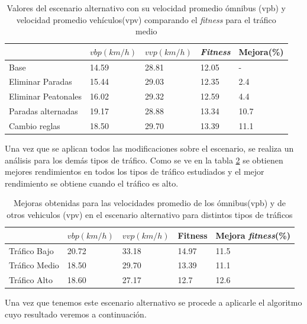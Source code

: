 \begin{table}[H]
	\renewcommand{\arraystretch}{1.2}
	\caption{Valores del escenario alternativo con su velocidad promedio ómnibus (vpb) y velocidad promedio vehículos(vpv) comparando el \emph{fitness} para el tráfico medio }
	\label{table:resultado_alternativo}
	\centering
	\begin{tabular}{p{3.5cm}p{2.5cm}p{2.5cm}p{2cm}p{2cm} }
		\hline
		&
		$vbp(km/h)$& 
		$vvp(km/h)$ & 
		\emph{Fitness} &
		Mejora(\%)
		\\ 
		\hline
		Base & 14.59  & 28.81& 12.05 & -\\
		Eliminar Paradas & 15.44  & 29.03& 12.35 & 2.4\\
		Eliminar Peatonales  & 16.02  & 29.32& 12.59 & 4.4\\
		Paradas alternadas  & 19.17  & 28.88& 13.34 & 10.7\\	
		Cambio reglas  & 18.50  & 29.70& 13.39 & 11.1\\				
		\hline
	\end{tabular}
\end{table}

Una vez que se aplican todos las modificaciones sobre el escenario, se realiza un análisis para los demás tipos de tráfico. Como se ve en la tabla \ref{table:mejoras_trafico_alternativo} se obtienen mejores rendimientos en todos los tipos de tráfico estudiados y el mejor rendimiento se obtiene cuando el tráfico es alto. 

\begin{table}[H]
	\renewcommand{\arraystretch}{1.2}
	\caption{Mejoras obtenidas para las velocidades promedio de los ómnibus(vpb) y de otros vehiculos (vpv) en el escenario alternativo para distintos tipos de tráficos }
	\label{table:mejoras_trafico_alternativo}
	\centering
	\begin{tabular}{p{3.5cm}p{2.5cm}p{2.5cm}p{2cm}p{2cm} }
		\hline
		&
		$vbp(km/h)$& 
		$vvp(km/h)$ & 
		Fitness &
		Mejora \emph{fitness}(\%)
		\\ 
		\hline

		Tráfico Bajo & 20.72  & 33.18 & 14.97 & 11.5\\
		Tráfico Medio & 18.50  & 29.70& 13.39 & 11.1 \\
		Tráfico Alto  & 18.60  & 27.17& 12.7 & 12.6\\		
		\hline
	\end{tabular}
\end{table}

Una vez que tenemos este escenario alternativo se procede a aplicarle el algoritmo cuyo resultado veremos a continuación.


